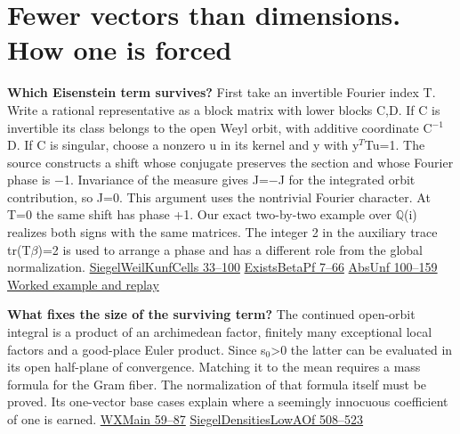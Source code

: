 \documentclass[11pt,letterpaper]{article}
\begin{document}
\section{Fewer vectors than dimensions. How one is forced}
\textbf{Which Eisenstein term survives?} First take an invertible Fourier index T. Write a rational representative as a block matrix with lower blocks C,D. If C is invertible its class belongs to the open Weyl orbit, with additive coordinate C\ensuremath{{}^{-1}}D. If C is singular, choose a nonzero u in its kernel and y with y\ensuremath{{}^{T}}Tu=1. The source constructs a shift whose conjugate preserves the section and whose Fourier phase is \ensuremath{-}1. Invariance of the measure gives J=\ensuremath{-}J for the integrated orbit contribution, so J=0. This argument uses the nontrivial Fourier character. At T=0 the same shift has phase +1. Our exact two-by-two example over \ensuremath{\mathbb{Q}}(i) realizes both signs with the same matrices. The integer 2 in the auxiliary trace tr(T\ensuremath{\beta})=2 is used to arrange a phase and has a different role from the global normalization. \href{https://github.com/nousentllc/riemann-hypothesis/blob/40e56bab026552e089d7afcfeff08d2defb9c005/src/Development/AutomorphicArithmetic/Foundations/GaloisRepresentations/ThetaParseval/ThetaKernels/SiegelWeilKunfCells.lean\#L33-L100}{SiegelWeilKunfCells 33–100} \href{https://github.com/nousentllc/riemann-hypothesis/blob/40e56bab026552e089d7afcfeff08d2defb9c005/src/Development/WeilBound/CoreStatements/AutomorphicKernels/SiegelWeilFormula/UnfoldingCompactness/ExistsBetaPf.lean\#L7-L66}{ExistsBetaPf 7–66} \href{https://github.com/nousentllc/riemann-hypothesis/blob/40e56bab026552e089d7afcfeff08d2defb9c005/src/Development/WeilBound/CoreStatements/AutomorphicKernels/SiegelWeilFormula/UnfoldingCompactness/AbsUnf.lean\#L100-L159}{AbsUnf 100–159} \href{https://github.com/nousentllc/riemann-hypothesis/blob/2c03d15e908bcbe4aae3c94a87c7ada402cd7911/research/uriel/experiments/siegel-weil-constant-term/orbit-cell/README.md}{Worked example and replay}

\textbf{What fixes the size of the surviving term?} The continued open-orbit integral is a product of an archimedean factor, finitely many exceptional local factors and a good-place Euler product. Since s\ensuremath{{}_{0}}>0 the latter can be evaluated in its open half-plane of convergence. Matching it to the mean requires a mass formula for the Gram fiber. The normalization of that formula itself must be proved. Its one-vector base cases explain where a seemingly innocuous coefficient of one is earned. \href{https://github.com/nousentllc/riemann-hypothesis/blob/40e56bab026552e089d7afcfeff08d2defb9c005/src/Development/WeilBound/CoreStatements/AutomorphicKernels/SiegelWeilFormula/WhittakerGlobalFactors/WXMain.lean\#L59-L87}{WXMain 59–87} \href{https://github.com/nousentllc/riemann-hypothesis/blob/40e56bab026552e089d7afcfeff08d2defb9c005/src/Development/WeilBound/CoreStatements/AutomorphicKernels/UnitarySchrodingerModel/UnitarySchrodingerLemmas/LowRankSiegelDensities/SiegelDensitiesLowAOf.lean\#L508-L523}{SiegelDensitiesLowAOf 508–523}
\end{document}
